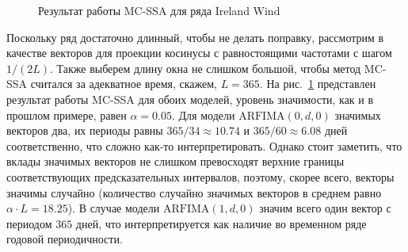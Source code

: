 \documentclass[specialist,
substylefile = spbu_report.rtx,
subf,href,colorlinks=true, 12pt]{disser}
\theoremstyle{definition}
\begin{document}
\begin{figure}[h]
	\centering
	\caption{Результат работы MC-SSA для ряда Ireland Wind}
	\label{fig:IrelandWind_mcssa}
\end{figure}

Поскольку ряд достаточно длинный, чтобы не делать поправку, рассмотрим в качестве векторов для проекции косинусы с равностоящими частотами с шагом $1/(2L)$. Также выберем длину окна не слишком большой, чтобы метод MC-SSA считался за адекватное время, скажем, $L=365$. На рис.~\ref{fig:IrelandWind_mcssa} представлен результат работы MC-SSA для обоих моделей, уровень значимости, как и в прошлом примере, равен $\alpha = 0.05$. Для модели $\mathrm{ARFIMA}(0, d, 0)$ значимых векторов два, их периоды равны $365 / 34\approx10.74$ и $365 / 60\approx6.08$ дней соответственно, что сложно как-то интерпретировать. Однако стоит заметить, что вклады значимых векторов не слишком превосходят верхние границы соответствующих предсказательных интервалов, поэтому, скорее всего, векторы значимы случайно (количество случайно значимых векторов в среднем равно $\alpha \cdot L=18.25$). В случае модели $\mathrm{ARFIMA}(1, d, 0)$ значим всего один вектор с периодом $365$ дней, что интерпретируется как наличие во временном ряде годовой периодичности.
\end{document}
